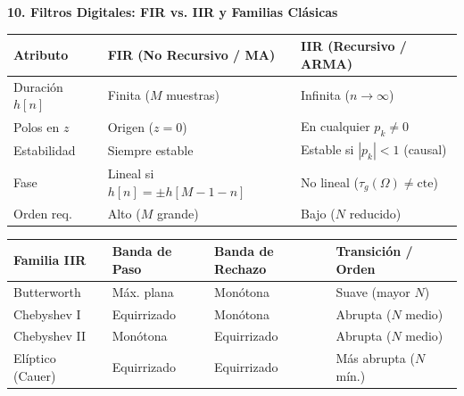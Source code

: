 \documentclass[10pt, a4paper, twocolumn]{article}
\begin{document}
\vspace{2pt}
\textbf{10. Filtros Digitales: FIR vs. IIR y Familias Clásicas}

{\scriptsize
\setlength{\tabcolsep}{2.5pt}
\renewcommand{\arraystretch}{1.2}
\begin{tabular}{@{}lll@{}}
\toprule
\textbf{Atributo} & \textbf{FIR (No Recursivo / MA)} & \textbf{IIR (Recursivo / ARMA)} \\
\midrule
Duración $h[n]$ & Finita ($M$ muestras) & Infinita ($n \to \infty$) \\
Polos en $z$ & Origen ($z = 0$) & En cualquier $p_k \neq 0$ \\
Estabilidad & Siempre estable & Estable si $|p_k| < 1$ (causal) \\
Fase & Lineal si $h[n] = \pm h[M-1-n]$ & No lineal ($\tau_g(\Omega) \neq \text{cte}$) \\
Orden req. & Alto ($M$ grande) & Bajo ($N$ reducido) \\
\bottomrule
\end{tabular}

\vspace{3pt}
\begin{tabular}{@{}llll@{}}
\toprule
\textbf{Familia IIR} & \textbf{Banda de Paso} & \textbf{Banda de Rechazo} & \textbf{Transición / Orden} \\
\midrule
Butterworth & Máx. plana & Monótona & Suave (mayor $N$) \\
Chebyshev I & Equirrizado & Monótona & Abrupta ($N$ medio) \\
Chebyshev II & Monótona & Equirrizado & Abrupta ($N$ medio) \\
Elíptico (Cauer) & Equirrizado & Equirrizado & Más abrupta ($N$ mín.) \\
\bottomrule
\end{tabular}
}
\end{document}
